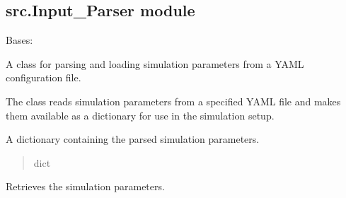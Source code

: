 \documentclass[letterpaper,10pt,english]{sphinxmanual}
\begin{document}
\subsection{src.Input\_Parser module}
\label{\detokenize{src:module-src.Input_Parser}}\label{\detokenize{src:src-input-parser-module}}

\begin{fulllineitems}
\label{\detokenize{src:src.Input_Parser.InputParser}}
\pysigstartsignatures
{}
\pysigstopsignatures
\sphinxAtStartPar
Bases: 

\sphinxAtStartPar
A class for parsing and loading simulation parameters from a YAML configuration file.

\sphinxAtStartPar
The  class reads simulation parameters from a specified YAML file
and makes them available as a dictionary for use in the simulation setup.

\begin{fulllineitems}
\label{\detokenize{src:src.Input_Parser.InputParser.parameters}}
\pysigstartsignatures
{}
\pysigstopsignatures
\sphinxAtStartPar
A dictionary containing the parsed simulation parameters.
\begin{quote}\begin{description}
\sphinxAtStartPar
dict

\end{description}\end{quote}

\end{fulllineitems}


\begin{fulllineitems}
\label{\detokenize{src:src.Input_Parser.InputParser.get_parameters}}
\pysigstartsignatures
{}
\pysigstopsignatures
\sphinxAtStartPar
Retrieves the simulation parameters.


\end{fulllineitems}
\end{fulllineitems}
\end{document}
